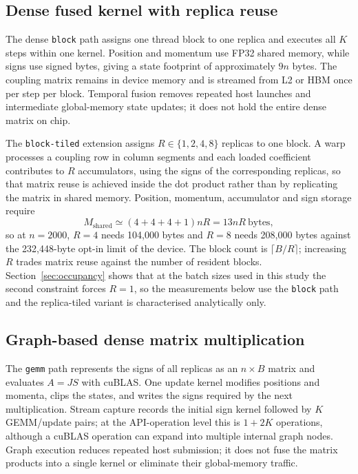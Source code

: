 \documentclass[11pt,a4paper]{article}
\newcommand{\code}[1]{\texttt{#1}}
\begin{document}
\subsection{Dense fused kernel with replica reuse}\label{sec:fused}
The dense \code{block} path assigns one thread block to one replica and executes all $K$ steps within one kernel. Position and momentum use FP32 shared memory, while signs use signed bytes, giving a state footprint of approximately $9n$ bytes. The coupling matrix remains in device memory and is streamed from L2 or HBM once per step per block. Temporal fusion removes repeated host launches and intermediate global-memory state updates; it does not hold the entire dense matrix on chip.

The \code{block-tiled} extension assigns $R\in\{1,2,4,8\}$ replicas to one block. A warp processes a coupling row in column segments and each loaded coefficient contributes to $R$ accumulators, using the signs of the corresponding replicas, so that matrix reuse is achieved inside the dot product rather than by replicating the matrix in shared memory. Position, momentum, accumulator and sign storage require
\begin{equation}
 M_{\mathrm{shared}}\simeq (4+4+4+1)nR=13nR\ \mathrm{bytes},
 \label{eq:shared}
\end{equation}
so at $n=2000$, $R=4$ needs 104,000 bytes and $R=8$ needs 208,000 bytes against the 232,448-byte opt-in limit of the device. The block count is $\lceil B/R\rceil$; increasing $R$ trades matrix reuse against the number of resident blocks. Section~\ref{sec:occupancy} shows that at the batch sizes used in this study the second constraint forces $R=1$, so the measurements below use the \code{block} path and the replica-tiled variant is characterised analytically only.

\subsection{Graph-based dense matrix multiplication}\label{sec:graphgemm}
The \code{gemm} path represents the signs of all replicas as an $n\times B$ matrix and evaluates $A=JS$ with cuBLAS. One update kernel modifies positions and momenta, clips the states, and writes the signs required by the next multiplication. Stream capture records the initial sign kernel followed by $K$ GEMM/update pairs; at the API-operation level this is $1+2K$ operations, although a cuBLAS operation can expand into multiple internal graph nodes. Graph execution reduces repeated host submission; it does not fuse the matrix products into a single kernel or eliminate their global-memory traffic.
\end{document}
